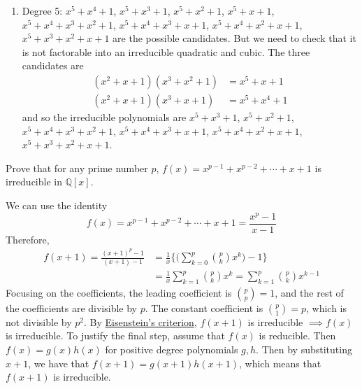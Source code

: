 \begin{solution}
\begin{enumerate}
      \item Degree 5: $x^5 + x^4 + 1$, $x^5 + x^3 + 1$, $x^5 + x^2 + 1$, $x^5 + x + 1$, $x^5 + x^4 + x^3 + x^2 + 1$, $x^5 + x^4 + x^3 + x + 1$, $x^5 + x^4 + x^2 + x + 1$, $x^5 + x^3 + x^2 + x + 1$ are the possible candidates. But we need to check that it is not factorable into an irreducible quadratic and cubic. The three candidates are 
      \begin{align}
        (x^2 + x + 1)(x^3 + x^2 + 1) & = x^5 + x + 1 \\
        (x^2 + x + 1)(x^3 + x + 1) & = x^5 + x^4 + 1
      \end{align}
      and so the irreducible polynomials are $x^5 + x^3 + 1$, $x^5 + x^2 + 1$, $x^5 + x^4 + x^3 + x^2 + 1$, $x^5 + x^4 + x^3 + x + 1$, $x^5 + x^4 + x^2 + x + 1$, $x^5 + x^3 + x^2 + x + 1$. 
    \end{enumerate}
  \end{solution}

  \begin{exercise}[Shifrin 3.3.7]
    Prove that for any prime number $p$, $f(x) = x^{p-1} + x^{p-2} + \cdots + x + 1$ is irreducible in $\mathbb{Q}[x]$.
  \end{exercise}
  \begin{solution}
    We can use the identity 
    \begin{equation}
      f(x) = x^{p-1} + x^{p-2} + \cdots + x + 1 = \frac{x^p - 1}{x - 1} 
    \end{equation}
    Therefore, 
    \begin{align}
      f(x+1) = \frac{(x+1)^p - 1}{(x + 1) - 1} & = \frac{1}{x}\bigg\{ \bigg( \sum_{k=0}^p \binom{p}{k} x^k \bigg) - 1 \bigg\} \\
                                               & = \frac{1}{x} \sum_{k=1}^p \binom{p}{k} x^k =  \sum_{k=1}^p \binom{p}{k} x^{k-1}
    \end{align}
    Focusing on the coefficients, the leading coefficient is $\binom{p}{p} = 1$, and the rest of the coefficients are divisible by $p$. The constant coefficient is $\binom{p}{1} = p$, which is not divisible by $p^2$. By \hyperref[thm:eisensteins-criterion]{Eisenstein's criterion}, $f(x+1)$ is irreducible $\implies f(x)$ is irreducible. To justify the final step, assume that $f(x)$ is reducible. Then $f(x) = g(x) h(x)$ for positive degree polynomials $g, h$. Then by substituting $x + 1$, we have that $f(x+1) = g(x+1) h(x+1)$, which means that $f(x+1)$ is irreducible. 
  \end{solution}

